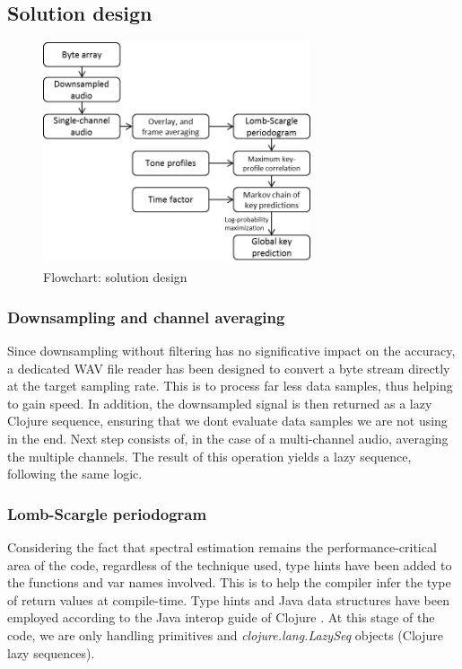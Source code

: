 \documentclass[letterpaper]{article}
\begin{document}
\subsection{Solution design}

\begin{figure}[h!]
\begin{center}
\includegraphics[width=3.1in,angle=0]{imgs/flowChart.png}
\caption{Flowchart: solution design}
\label{fig3}
\end{center}
\end{figure}

\subsubsection{Downsampling and channel averaging}

Since downsampling without filtering has no significative impact on the accuracy, a dedicated WAV file reader has been designed to convert a byte stream directly
at the target sampling rate. This is to process far less data samples, thus helping to gain speed. In addition, the downsampled signal is then returned as
a lazy Clojure sequence, ensuring that we don\textquotesingle t evaluate data samples we are not using in the end.
Next step consists of, in the case of a multi-channel audio, averaging the multiple channels. The result of this operation yields a lazy sequence, following
the same logic.

\subsubsection{Lomb-Scargle periodogram}

Considering the fact that spectral estimation remains the performance-critical area of the code, regardless of the technique used, type hints have been added to the functions and var names involved. This is to help the compiler infer the type of return values at compile-time.
Type hints and Java data structures have been employed according to the Java interop guide of Clojure \citep{CL}.
At this stage of the code, we are only handling primitives and \textit{clojure.lang.LazySeq} objects (Clojure lazy sequences).\\
\end{document}
